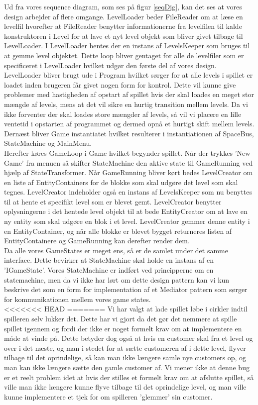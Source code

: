 Ud fra vores sequence diagram, som ses på figur \ref{seqDig}, kan det ses at vores design arbejder af flere omgange. LevelLoader beder FileReader om at læse en levelfil hvorefter at FileReader benytter informationerne fra levelfilen til kalde konstruktoren i Level for at lave et nyt level objekt som bliver givet tilbage til LevelLoader. I LevelLoader hentes der en instans af LevelsKeeper som bruges til at gemme level objektet. Dette loop bliver gentaget for alle de levelfiler som er specificeret i LevelLoader hvilket udgør den første del af vores design. LevelLoader bliver brugt ude i Program hvilket sørger for at alle levels i spillet er loadet inden brugeren får givet nogen form for kontrol. Dette vil kunne give problemer med hastigheden af opstart af spillet hvis der skal loades en meget stor mængde af levels, mens at det vil sikre en hurtig transition mellem levels. Da vi ikke forventer der skal loades store mængder af levels, så vil vi placere en lille ventetid i opstarten af programmet og dermed opnå et hurtigt skift mellem levels. \\
Dernæst bliver Game instantiatet hvilket resulterer i instantiationen af SpaceBus, StateMachine og MainMenu.\\
Herefter køres GameLoop i Game hvilket begynder spillet. Når der trykkes 'New Game' fra menuen så skifter StateMachine den aktive state til GameRunning ved hjælp af StateTransformer. Når GameRunning bliver kørt bedes LevelCreator om en liste af EntityContainers for de blokke som skal udgøre det level som skal tegnes. LevelCreator indeholder også en instans af LevelsKeeper som nu benyttes til at hente et specifikt level som er blevet gemt. LevelCreator benytter oplysningerne i det hentede level objekt til at bede EntityCreator om at lave en ny entity som skal udgøre en blok i et level. LevelCreator gemmer denne entity i en EntityContainer, og når alle blokke er blevet bygget returneres listen af EntityContainere og GameRunning kan derefter render dem.\\
Da alle vores GameStates er meget ens, så er de samlet under det samme interface. Dette bevirker at StateMachine skal holde en instans af en 'IGameState'. Vores StateMachine er indført ved principperne om en statemachine, men da vi ikke har lørt om dette design pattern kan vi kun beskrive det som en form for implementation af et Mediator pattern som sørger for kommunikationen mellem vores game states.\\

<<<<<<< HEAD
=======
Vi har valgt at lade spillet løbe i cirkler indtil spilleren selv lukker det. Dette har vi gjort da det gør det nemmere at spille spillet igennem og fordi der ikke er noget formelt krav om at implementere en måde at vinde på. Dette betyder dog også at hvis en customer skal fra et level og over i det næste, og man i stedet for at sætte customeren af i dette level, flyver tilbage til det oprindelige, så kan man ikke længere samle nye customers op, og man kan ikke længere sætte den gamle customer af. Vi mener ikke at denne bug er et reelt problem idet at hvis der stilles et formelt krav om at afslutte spillet, så ville man ikke længere kunne flyve tilbage til det oprindelige level, og man ville kunne implementere et tjek for om spilleren 'glemmer' sin customer.

